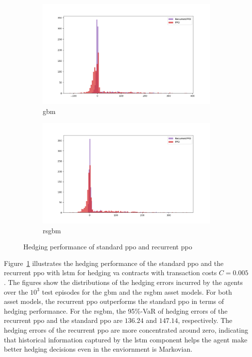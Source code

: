 \begin{figure}[ht!]
    \centering
    \begin{subfigure}{0.45\textwidth}
        \includegraphics[width=\textwidth]{./futureWork/figures/PPOs_GBM.png}
        \caption{\gls{gbm}}
    \end{subfigure}
    \hspace{1cm}
    \begin{subfigure}{0.45\textwidth}
        \includegraphics[width=\textwidth]{./futureWork/figures/PPOs_GBMRS.png}
        \caption{\gls{rsgbm}}
    \end{subfigure}
    \caption{Hedging performance of standard \gls{ppo} and recurrent \gls{ppo}} 
    \label{fig3:ppo_result}
\end{figure}

Figure~\ref{fig3:ppo_result} illustrates the hedging performance of the standard \gls{ppo} and the recurrent \gls{ppo} with \gls{lstm} for hedging \gls{va} contracts with transaction costs $C=0.005$.
The figures show the distributions of the hedging errors incurred by the agents over the $10^3$ test episodes for the \gls{gbm} and the \gls{rsgbm} asset models.
For both asset models, the recurrent \gls{ppo} outperforms the standard \gls{ppo} in terms of hedging performance.
For the \gls{rsgbm}, the 95\%-VaR of hedging errors of the recurrent \gls{ppo} and the standard \gls{ppo} are $136.24$ and $147.14$, respectively.
The hedging errors of the recurrent \gls{ppo} are more concentrated around zero, indicating that historical information captured by the \gls{lstm} component helps the agent make better hedging decisions even in the enviornment is Markovian.

